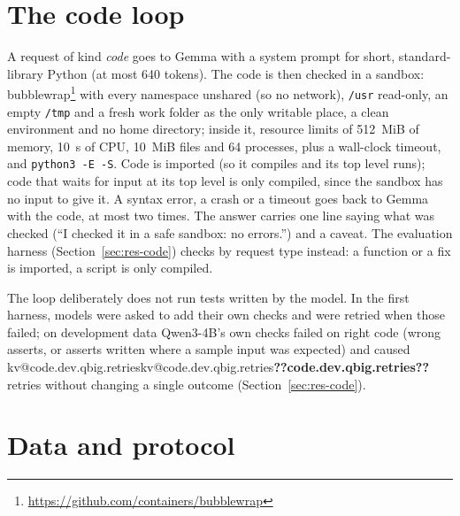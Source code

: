 \documentclass[11pt,a4paper]{article}
\makeatletter
\DeclareRobustCommand{\kv}[1]{\ifcsname kv@#1\endcsname\csname kv@#1\endcsname\else\textbf{??#1??}\fi}
\makeatother
\begin{document}
\section{The code loop}\label{sec:code}

A request of kind \emph{code} goes to Gemma with a system prompt for short, standard-library Python (at most 640
tokens). The code is then checked in a sandbox: bubblewrap\footnote{\url{https://github.com/containers/bubblewrap}}
with every namespace unshared (so no network), \texttt{/usr} read-only, an empty \texttt{/tmp} and a fresh work folder
as the only writable place, a clean environment and no home directory; inside it, resource limits of 512~MiB of
memory, 10~s of CPU, 10~MiB files and 64 processes, plus a wall-clock timeout, and \texttt{python3 -E -S}. Code is
imported (so it compiles and its top level runs); code that waits for input at its top level is only compiled, since
the sandbox has no input to give it. A syntax error, a crash or a timeout goes back to Gemma with the code, at most two
times. The answer carries one line saying what was checked (``I checked it in a safe sandbox: no errors.'') and a
caveat. The evaluation harness (Section~\ref{sec:res-code}) checks by request type instead: a function or a fix is
imported, a script is only compiled.

The loop deliberately does not run tests written by the model. In the first harness, models were asked to add their
own checks and were retried when those failed; on development data Qwen3-4B's own checks failed on right code (wrong
asserts, or asserts written where a sample input was expected) and caused \kv{code.dev.qbig.retries} retries without
changing a single outcome (Section~\ref{sec:res-code}).

\section{Data and protocol}\label{sec:setup}

\begin{table}[t]
\centering\small
\caption{The v3 evaluation sets. All are synthetic: drafted with an AI assistant from families of English and
Romanized Hindi (Hinglish) phrasings, and split by family. ``Reviewed'' means reviewed by the author; ``claude
reviewed'' means the author waived the review and the AI assistant reviewed it, with a separate agent judging the files
against written criteria. Kinds-v2's test split contains Kinds-v1's test split plus \kv{kv2.test.fresh} fresh items.}
\label{tab:datasets}
\resizebox{\textwidth}{!}{}
\end{table}
\end{document}
